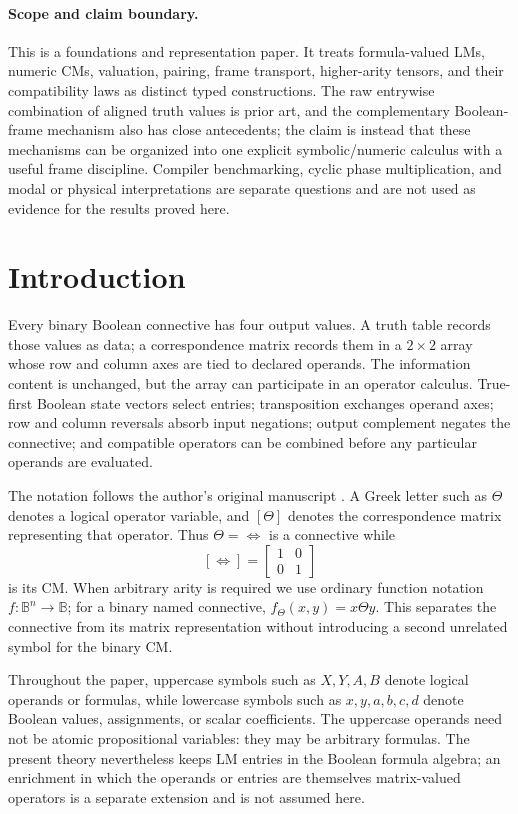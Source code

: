 \documentclass[11pt]{article}
\theoremstyle{definition}
\theoremstyle{remark}
\newcommand{\B}{\mathbb B}
\begin{document}
\paragraph{Scope and claim boundary.}
This is a foundations and representation paper.  It treats formula-valued LMs, numeric CMs, valuation, pairing, frame transport, higher-arity tensors, and their compatibility laws as distinct typed constructions.  The raw entrywise combination of aligned truth values is prior art, and the complementary Boolean-frame mechanism also has close antecedents; the claim is instead that these mechanisms can be organized into one explicit symbolic/numeric calculus with a useful frame discipline.  Compiler benchmarking, cyclic phase multiplication, and modal or physical interpretations are separate questions and are not used as evidence for the results proved here.

\section{Introduction}

Every binary Boolean connective has four output values.  A truth table records those values as data; a correspondence matrix records them in a $2\times2$ array whose row and column axes are tied to declared operands.  The information content is unchanged, but the array can participate in an operator calculus.  True-first Boolean state vectors select entries; transposition exchanges operand axes; row and column reversals absorb input negations; output complement negates the connective; and compatible operators can be combined before any particular operands are evaluated.

The notation follows the author's original manuscript \cite{Droncheff2018}.  A Greek letter such as $\Theta$ denotes a logical operator variable, and $[\Theta]$ denotes the correspondence matrix representing that operator.  Thus $\Theta=\Leftrightarrow$ is a connective while
\[
 [\Leftrightarrow]=\begin{bmatrix}1&0\\0&1\end{bmatrix}
\]
is its CM.  When arbitrary arity is required we use ordinary function notation $f:\B^n\to\B$; for a binary named connective, $f_\Theta(x,y)=x\Theta y$.  This separates the connective from its matrix representation without introducing a second unrelated symbol for the binary CM.

Throughout the paper, uppercase symbols such as $X,Y,A,B$ denote logical operands or formulas, while lowercase symbols such as $x,y,a,b,c,d$ denote Boolean values, assignments, or scalar coefficients.  The uppercase operands need not be atomic propositional variables: they may be arbitrary formulas.  The present theory nevertheless keeps LM entries in the Boolean formula algebra; an enrichment in which the operands or entries are themselves matrix-valued operators is a separate extension and is not assumed here.
\end{document}
